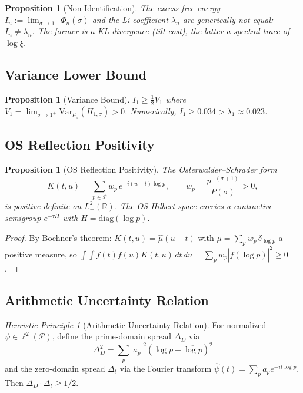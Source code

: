 \documentclass[12pt,a4paper]{article}
\newtheorem{proposition}[theorem]{Proposition}
\theoremstyle{definition}
\theoremstyle{remark}
\newtheorem{heuristic}[theorem]{Heuristic Principle}
\newcommand{\muG}{\mu_\sigma}
\newcommand{\PP}{\mathcal{P}}
\begin{document}
\begin{proposition}[Non-Identification]
\label{prop:non-ident}
The excess free energy $I_n := \lim_{\sigma \to 1^+}\Phi_n(\sigma)$ and the Li coefficient $\lambda_n$ are generically \emph{not} equal: $I_n \neq \lambda_n$. The former is a KL divergence (tilt cost), the latter a spectral trace of $\log\xi$.
\end{proposition}

\subsection{Variance Lower Bound}

\begin{proposition}[Variance Bound]
\label{prop:variance}
$I_1 \geq \frac{1}{2}V_1$ where $V_1 = \lim_{\sigma \to 1^+}\mathrm{Var}_{\muG}(H_{1,\sigma}) > 0$. Numerically, $I_1 \geq 0.034 > \lambda_1 \approx 0.023$.
\end{proposition}

\subsection{OS Reflection Positivity}

\begin{proposition}[OS Reflection Positivity]
\label{prop:os}
The Osterwalder--Schrader form
\[
K(t,u) = \sum_{p \in \PP} w_p\,e^{-i(u-t)\log p}, \qquad w_p = \frac{p^{-(\sigma+1)}}{P(\sigma)} > 0,
\]
is positive definite on $L^2_+(\mathbb{R})$. The OS Hilbert space carries a contractive semigroup $e^{-\tau H}$ with $H = \mathrm{diag}(\log p)$.
\end{proposition}

\begin{proof}
By Bochner's theorem: $K(t,u) = \hat{\mu}(u-t)$ with $\mu = \sum_p w_p\,\delta_{\log p}$ a positive measure, so $\int\!\!\int \bar{f}(t)f(u)K(t,u)\,dt\,du = \sum_p w_p|\hat{f}(\log p)|^2 \geq 0$.
\end{proof}

\subsection{Arithmetic Uncertainty Relation}

\begin{heuristic}[Arithmetic Uncertainty Relation]
\label{heur:uncertainty}
For normalized $\psi \in \ell^2(\PP)$, define the prime-domain spread $\Delta_D$ via
\[
\Delta_D^2 = \sum_p |a_p|^2(\log p - \overline{\log p})^2
\]
and the zero-domain spread $\Delta_t$ via the Fourier transform $\hat\psi(t) = \sum_p a_p e^{-it\log p}$. Then $\Delta_D \cdot \Delta_t \geq 1/2$.
\end{heuristic}
\end{document}
